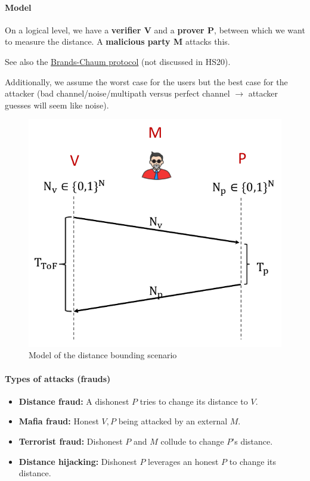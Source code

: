 \paragraph{Model}
On a logical level, we have a \textbf{verifier V} and a \textbf{prover P}, between which we want to measure the distance.
A \textbf{malicious party M} attacks this.

See also the \href{https://www.iacr.org/workshops/fse2013/slides/Slides02.pdf}{Brands-Chaum protocol} (not discussed in HS20).

Additionally, we assume the worst case for the users but the best case for the attacker (bad channel/noise/multipath versus perfect channel $\rightarrow$ attacker guesses will seem like noise).

\begin{figure}[h]
	\centering
	\includegraphics[scale=0.4]{images/5-model.png}
	\caption{Model of the distance bounding scenario}
	\label{fig:ranging-model}
\end{figure}

\paragraph{Types of attacks (frauds)}
\begin{itemize}
	\item \textbf{Distance fraud:} A dishonest $P$ tries to change its distance to $V$.
	\item \textbf{Mafia fraud:} Honest $V, P$ being attacked by an external $M$.
	\item \textbf{Terrorist fraud:} Dishonest $P$ and $M$ collude to change $P$'s distance.
	\item \textbf{Distance hijacking:} Dishonest $P$ leverages an honest $P$ to change its distance.
\end{itemize}

